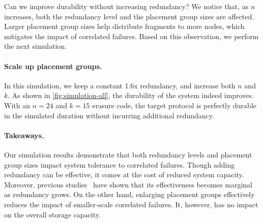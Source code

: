 Can we improve durability without increasing redundancy?
We notice that, as $n$ increases, both the redundancy level and the placement group sizes are affected.
Larger placement group sizes help distribute fragments to more nodes, which mitigates the impact of correlated failures.
Based on this observation, we perform the next simulation.


\paragraph{Scale up placement groups.}
In this simulation, we keep a constant 1.6x redundancy, and increase both $n$ and $k$.
As shown in \autoref{fig:simulation-all}, the durability of the system indeed improves.
With an $n = 24$ and $k = 15$ erasure code, the target protocol is perfectly durable in the simulated duration without incurring additional redundancy.

\paragraph{Takeaways.}
Our simulation results demonstrate that both redundancy levels and placement group sizes impact system tolerance to correlated failures.
Though adding redundancy can be effective, it comes at the cost of reduced system capacity.
Moreover, previous studies~\cite{irisstore} have shown that its effectiveness becomes marginal as redundancy grows.
On the other hand, enlarging placement groups effectively reduces the impact of smaller-scale correlated failures.
It, however, has no impact on the overall storage capacity.
